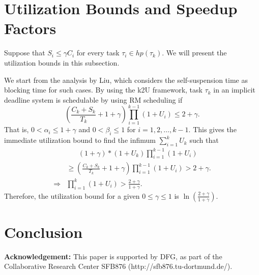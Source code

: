 \documentclass[10pt,conference,preprint]{IEEEtran}
\def\myendproof{{\ \vbox{\hrule\hbox{%
   \vrule height1.3ex\hskip0.8ex\vrule}\hrule }}\par}
\renewenvironment{proof}{\noindent{\bf Proof. }}{\myendproof}
\newtheorem{Corollary}{Corollary}
\begin{document}
  



\section{Utilization Bounds and Speedup Factors}
Suppose that $S_i \leq \gamma C_i$ for every task $\tau_i \in hp(\tau_k)$. We will present the utilization bounds in this subsection. 

We start from the analysis by Liu, which considers the self-suspension time as blocking time for such cases.
By using the k2U framework, task $\tau_k$ in an implicit deadline system is schedulable by using RM scheduling if
\[
(\frac{C_k + S_k}{ T_k}+1+\gamma) \prod_{i=1}^{k-1}(1+U_i) \leq 2+\gamma.
\]
That is, $0 < \alpha_i \leq  1+\gamma$ and $0 < \beta_i \leq 1$ for $i=1,2,\ldots,k-1$.
This gives the immediate utilization bound to find the infimum $\sum_{i=1}^{k} U_k$ such that
\begin{align*}
&\;\;\;\;\;\; (1+\gamma)*(1+U_k) \prod_{i=1}^{k-1}(1+U_i) \\
&\geq (\frac{C_k + S_k}{ T_k}+1+\gamma) \prod_{i=1}^{k-1}(1+U_i) > 2+\gamma.\\
\Rightarrow & \prod_{i=1}^{k}(1+U_i) > \frac{2+\gamma}{1+\gamma}.
\end{align*}
Therefore, the utilization bound for a given $0 \leq \gamma \leq 1$  is $\ln(\frac{2+\gamma}{1+\gamma})$.


\section{Conclusion}
\label{sec:conclusion}


{\bf Acknowledgement:} This paper is supported by DFG, as part of the Collaborative Research Center SFB876 (http://sfb876.tu-dortmund.de/).

{}
\end{document}
